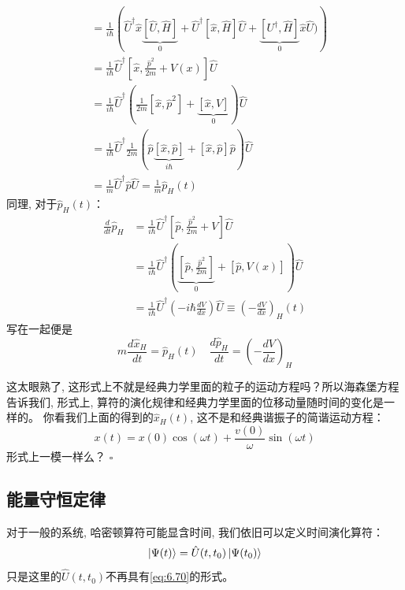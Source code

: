 \begin{thinknote}
\begin{equation}
\begin{aligned}
            &=\frac{1}{i \hbar}\left(\hat{U}^{\dagger} \hat{x}\underbrace{\left[\hat{U}, \hat{H}\right ]}_{0}+\hat{U}^{\dagger}[\hat{x}, \hat{H}] \hat{U}+\underbrace{\left[U^{\dagger}, \hat{H}\right]}_{0} \hat{x} \hat{U})\right)\\
            &=\frac{1}{i \hbar} \hat{U}^{\dagger}\left[\hat{x}, \frac{\hat{p}^{2}}{2 m}+V(x)\right] \hat{U} \\
            &=\frac{1}{i \hbar} \hat{U}^{\dagger}(\frac{1}{2 m}\left[\hat{x}, \hat{p}^{2}\right]+\underbrace{[\hat{x}, V]}_{0}) \hat{U} \\
            &=\frac{1}{i \hbar} \hat{U}^{\dagger} \frac{1}{2 m}(\hat{p} \underbrace{[\hat{x}, \hat{p}]}_{i \hbar}+[\hat{x}, \hat{p}] \hat{p}) \hat{U} \\
            &=\frac{1}{m} \hat{U}^{\dagger} \hat{p} \hat{U}=\frac{1}{m} \hat{p}_{H}(t) 
        \end{aligned}
    \end{equation}
    同理, 对于$\hat{p}_H(t)$：
    \begin{equation}
        \begin{aligned}
            \frac{d}{d t} \hat{p}_{H} &=\frac{1}{i \hbar} \hat{U}^{\dagger}\left[\hat{p}, \frac{\hat{p}^{2}}{2 m}+V\right] \hat{U} \\
            &=\frac{1}{i \hbar} \hat{U}^{\dagger}\left(\underbrace{\left[\hat{p}, \frac{\hat{p}^{2}}{2 m}\right]}_{0}+[\hat{p}, V(x)]\right) \hat{U} \\
            &=\frac{1}{i \hbar} \hat{U}^{\dagger}\left(-i \hbar \frac{d V}{d x}\right) \hat{U}\equiv \left(-\frac{d V}{d x}\right)_{H}(t)
        \end{aligned}
    \end{equation}
    写在一起便是
    \begin{equation}
        \boxed{m \frac{d \hat{x}_{H}}{d t}=\hat{p}_{H}(t) \quad \frac{d \hat{p}_{H}}{d t}=\left(-\frac{d V}{d x}\right)_{H}}
    \end{equation}

    \setlength\parindent{2em}这太眼熟了, 这形式上不就是经典力学里面的粒子的运动方程吗？所以海森堡方程告诉我们, 形式上, 算符的演化规律和经典力学里面的位移动量随时间的变化是一样的。
    你看我们上面的得到的$\hat{x}_H(t)$, 这不是和经典谐振子的简谐运动方程：
    \[x(t)=x(0)\cos(\omega t)+\frac{v(0)}{\omega}\sin (\omega t)\]
    形式上一模一样么？
    \hfill $\square$\par
\end{thinknote}
\subsection{能量守恒定律}
对于一般的系统, 哈密顿算符可能显含时间, 我们依旧可以定义时间演化算符：
\begin{equation}
    \label{eq:6.77}
    \ket{\Psi(t)}=\hat{U}(t,t_0)\ket{\Psi(t_0)}
\end{equation}
只是这里的$\hat{U}(t,t_0)$不再具有\ref{eq:6.70}的形式。

